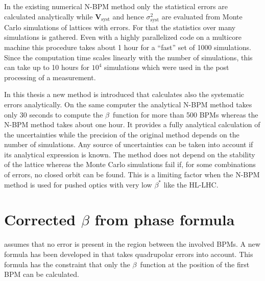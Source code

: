 In the existing numerical N-BPM method only the statistical errors are calculated analytically while
$\mathbf{V}_\text{syst}$ and hence $\sigma_\text{syst}^2$ are evaluated from Monte Carlo simulations
of lattices with errors.
For that the statistics over many simulations is gathered.
Even with a highly parallelized code on a multicore machine this procedure takes about 1 hour for a
``fast'' set of 1000 simulations. Since the computation time scales linearly with the number of simulations,
this can take up to 10 hours for $10^{4}$ simulations which were used in the post processing of a measurement.

In this thesis a new method is introduced that calculates also the systematic errors analytically. 
On the same computer the analytical N-BPM method takes only 30 seconds to compute the $ \beta $~function
for more than 500 BPMs whereas the N-BPM method takes about one hour.
It provides a fully analytical calculation of the uncertainties while the precision of the original
method depends on the number of simulations. Any source of uncertainties can be taken into account
if its analytical expression is known. The method does not depend on the stability of the lattice whereas
the Monte Carlo simulations fail if, for some combinations of errors, no closed orbit can be found.
This is a limiting factor when the N-BPM method is used for pushed optics with very low $ \beta^* $ like the HL-LHC. 



\section{Corrected \texorpdfstring{$\beta$}{beta} from phase formula}
\label{sec_corrected_beta_from_phase}
 assumes that no error is present in the region between the involved BPMs.
A new formula has been developed in \cite{Franchi2016} that takes quadrupolar errors into account.
This formula has the constraint that only the $\beta$~function at the position of the first BPM can
be calculated.

